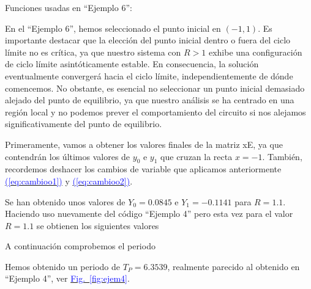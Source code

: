 \documentclass[12pt,a4paper]{report} %
\newcommand{\fref}[1]{\hyperref[#1]{\textcolor{blue}{Fig.~\ref*{#1}}}}
\newcommand{\eref}[1]{\hyperref[#1]{\textcolor{blue}{(\ref*{#1})}}}
\newcommand{\fref}[1]{\hyperref[#1]{\textcolor{blue}{\textit{Fig.~\ref*{#1}}}}}
\newcommand{\eref}[1]{\hyperref[#1]{\textcolor{blue}{\textit{(\ref*{#1})}}}}
\begin{document}
	
	
	\vspace{0.5cm}\noindent Funciones usadas en ``Ejemplo 6'':
	\vspace{0.5cm}
	\vspace{0.5cm}
	
	\newpage
	
	En el ``Ejemplo 6'', hemos seleccionado el punto inicial en $(-1,1)$. Es importante destacar que la elección del punto inicial dentro o fuera del ciclo límite no es crítica, ya que nuestro sistema con $R>1$ exhibe una configuración de ciclo límite asintóticamente estable. En consecuencia, la solución eventualmente convergerá hacia el ciclo límite, independientemente de dónde comencemos. No obstante, es esencial no seleccionar un punto inicial demasiado alejado del punto de equilibrio, ya que nuestro análisis se ha centrado en una región local y no podemos prever el comportamiento del circuito si nos alejamos significativamente del punto de equilibrio.
	
	\vspace{0.5cm}\noindent Primeramente, vamos a obtener los valores finales de la matriz xE, ya que contendrán los últimos valores de $y_0$ e $y_1$ que cruzan la recta $x=-1$. También, recordemos deshacer los cambios de variable que aplicamos anteriormente \eref{eq:cambioo1} y \eref{eq:cambioo2}.
	
	\vspace{1cm}
	
	\vspace{1cm}\noindent Se han obtenido unos valores de $Y_0=0.0845$ e $Y_1=-0.1141$ para $R=1.1$. Haciendo uso nuevamente del código ``Ejemplo 4'' pero esta vez para el valor $R=1.1$ se obtienen los siguientes valores
	
	\vspace{1cm}
	
	\newpage
	
	\vspace{0.5cm}\noindent A continuación comprobemos el periodo
	
	\vspace{1cm}
	
	\vspace{1cm}\noindent Hemos obtenido un periodo de $T_P=6.3539$, realmente parecido al obtenido en ``Ejemplo 4'', ver \fref{fig:ejem4}.
	
\end{document}
